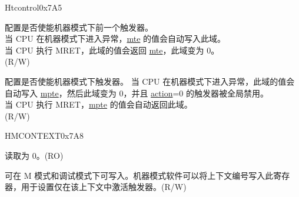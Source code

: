 \begin{register}{H}{tcontrol}{0x7A5}\label{regdesc:TCONTROL}
%
%
%
%
\regnewline%
\begin{regdesc}\begin{reglist}
\label{fielddesc:TCONTROLMPTE}\item [mpte] 配置是否使能机器模式下前一个触发器。\\
当 CPU 在机器模式下进入异常，\hyperref[fielddesc:TCONTROLMTE]{mte} 的值会自动写入此域。\\
当 CPU 执行 MRET，此域的值会返回 \hyperref[fielddesc:TCONTROLMTE]{mte}，此域变为 0。\\
(R/W)
\label{fielddesc:TCONTROLMTE}\item [mte] 配置是否使能机器模式下触发器。
当 CPU 在机器模式下进入异常，此域的值会自动写入 \hyperref[fielddesc:TCONTROLMPTE]{mpte}，然后此域变为 0，并且 \hyperref[fielddesc:MCONTROLACTION]{action}=0 的触发器被全局禁用。\\
当 CPU 执行 MRET，\hyperref[fielddesc:TCONTROLMPTE]{mpte} 的值会自动返回此域。\\
(R/W)
\end{reglist}\end{regdesc}
\end{register}

\begin{register}{H}{MCONTEXT}{0x7A8}\label{regdesc:MCONTEXT}
%
%
\regnewline%
\begin{regdesc}\begin{reglist}
\label{fielddesc:monctext_rsvd}\item [Reserved] 读取为 0。(RO)
\label{fielddesc:CONTEXT}\item [context] 可在 M 模式和调试模式下可写入。机器模式软件可以将上下文编号写入此寄存器，用于设置仅在该上下文中激活触发器。(R/W)
\end{reglist}\end{regdesc}
\end{register}

